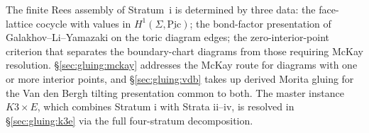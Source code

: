 \bigskip

The finite Rees assembly of Stratum~i is determined by three data: the
face-lattice cocycle with values in
$H^1(\Sigma, \underline{\mathrm{Pic}})$; the bond-factor presentation of
Galakhov--Li--Yamazaki on the toric diagram edges; the zero-interior-point
criterion that separates the boundary-chart diagrams from those
requiring McKay resolution. \S\ref{sec:gluing:mckay} addresses the McKay route for
diagrams with one or more interior points, and \S\ref{sec:gluing:vdb} takes up derived
Morita gluing for the Van den Bergh tilting presentation common to
both. The master instance $K3 \times E$, which combines Stratum i with
Strata ii--iv, is resolved in \S\ref{sec:gluing:k3e} via the full four-stratum
decomposition.

